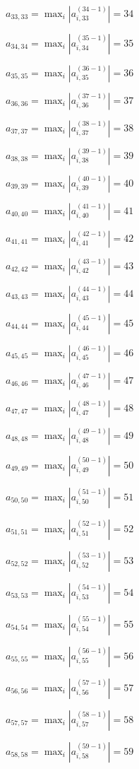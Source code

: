 \documentclass[a4paper,12pt]{article}
\begin{document}
$a _{ 33, 33 } =  \max _i |a _{ i, 33 } ^{ (34 - 1) } | = 34$

$a _{ 34, 34 } =  \max _i |a _{ i, 34 } ^{ (35 - 1) } | = 35$

$a _{ 35, 35 } =  \max _i |a _{ i, 35 } ^{ (36 - 1) } | = 36$

$a _{ 36, 36 } =  \max _i |a _{ i, 36 } ^{ (37 - 1) } | = 37$

$a _{ 37, 37 } =  \max _i |a _{ i, 37 } ^{ (38 - 1) } | = 38$

$a _{ 38, 38 } =  \max _i |a _{ i, 38 } ^{ (39 - 1) } | = 39$

$a _{ 39, 39 } =  \max _i |a _{ i, 39 } ^{ (40 - 1) } | = 40$

$a _{ 40, 40 } =  \max _i |a _{ i, 40 } ^{ (41 - 1) } | = 41$

$a _{ 41, 41 } =  \max _i |a _{ i, 41 } ^{ (42 - 1) } | = 42$

$a _{ 42, 42 } =  \max _i |a _{ i, 42 } ^{ (43 - 1) } | = 43$

$a _{ 43, 43 } =  \max _i |a _{ i, 43 } ^{ (44 - 1) } | = 44$

$a _{ 44, 44 } =  \max _i |a _{ i, 44 } ^{ (45 - 1) } | = 45$

$a _{ 45, 45 } =  \max _i |a _{ i, 45 } ^{ (46 - 1) } | = 46$

$a _{ 46, 46 } =  \max _i |a _{ i, 46 } ^{ (47 - 1) } | = 47$

$a _{ 47, 47 } =  \max _i |a _{ i, 47 } ^{ (48 - 1) } | = 48$

$a _{ 48, 48 } =  \max _i |a _{ i, 48 } ^{ (49 - 1) } | = 49$

$a _{ 49, 49 } =  \max _i |a _{ i, 49 } ^{ (50 - 1) } | = 50$

$a _{ 50, 50 } =  \max _i |a _{ i, 50 } ^{ (51 - 1) } | = 51$

$a _{ 51, 51 } =  \max _i |a _{ i, 51 } ^{ (52 - 1) } | = 52$

$a _{ 52, 52 } =  \max _i |a _{ i, 52 } ^{ (53 - 1) } | = 53$

$a _{ 53, 53 } =  \max _i |a _{ i, 53 } ^{ (54 - 1) } | = 54$

$a _{ 54, 54 } =  \max _i |a _{ i, 54 } ^{ (55 - 1) } | = 55$

$a _{ 55, 55 } =  \max _i |a _{ i, 55 } ^{ (56 - 1) } | = 56$

$a _{ 56, 56 } =  \max _i |a _{ i, 56 } ^{ (57 - 1) } | = 57$

$a _{ 57, 57 } =  \max _i |a _{ i, 57 } ^{ (58 - 1) } | = 58$

$a _{ 58, 58 } =  \max _i |a _{ i, 58 } ^{ (59 - 1) } | = 59$
\end{document}
